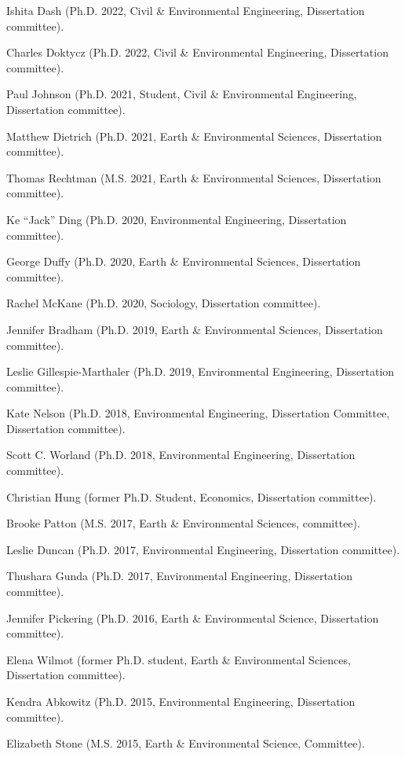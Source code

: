 \item Ishita Dash (Ph.D. 2022, Civil \& Environmental Engineering, Dissertation committee).
\item Charles Doktycz (Ph.D. 2022, Civil \& Environmental Engineering, Dissertation committee).
\item Paul Johnson (Ph.D. 2021, Student, Civil \& Environmental Engineering, Dissertation committee).
\item Matthew Dietrich (Ph.D. 2021, Earth \& Environmental Sciences, Dissertation committee).
\item Thomas Rechtman (M.S. 2021, Earth \& Environmental Sciences, Dissertation committee).
\item Ke ``Jack'' Ding (Ph.D. 2020, Environmental Engineering, Dissertation committee).
\item George Duffy (Ph.D. 2020, Earth \& Environmental Sciences, Dissertation committee).
\item Rachel McKane (Ph.D. 2020, Sociology, Dissertation committee).
\item Jennifer Bradham (Ph.D. 2019, Earth \& Environmental Sciences, Dissertation committee).
\item Leslie Gillespie-Marthaler (Ph.D. 2019, Environmental Engineering, Dissertation committee).
\item Kate Nelson (Ph.D. 2018, Environmental Engineering, Dissertation Committee, Dissertation committee).
\item Scott C. Worland (Ph.D. 2018, Environmental Engineering, Dissertation committee).
\item Christian Hung (former Ph.D. Student, Economics, Dissertation committee).
\item Brooke Patton (M.S. 2017, Earth \& Environmental Sciences, committee).
\item Leslie Duncan (Ph.D. 2017, Environmental Engineering, Dissertation committee).
\item Thushara Gunda (Ph.D. 2017, Environmental Engineering, Dissertation committee).
\item Jennifer Pickering (Ph.D. 2016, Earth \& Environmental Science, Dissertation committee).
\item Elena Wilmot (former Ph.D. student, Earth \& Environmental Sciences, Dissertation committee).
\item Kendra Abkowitz (Ph.D. 2015, Environmental Engineering, Dissertation committee).
\item Elizabeth Stone (M.S. 2015, Earth \& Environmental Science, Committee).
